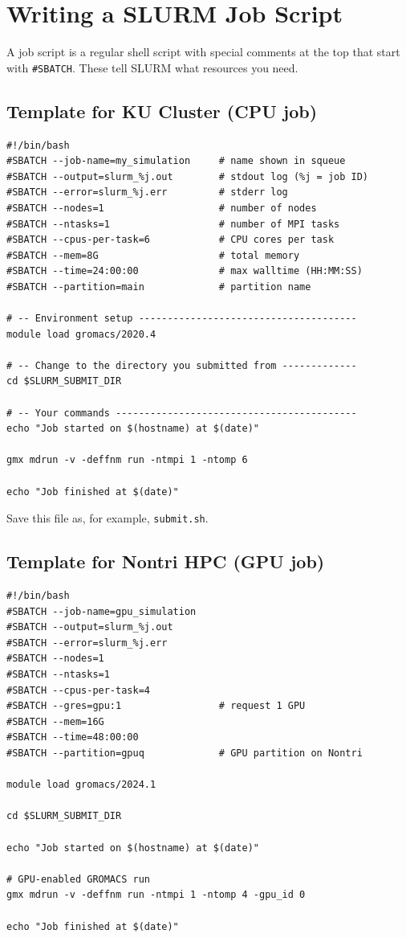 \documentclass[12pt,a4paper]{article}
\begin{document}
\section{Writing a SLURM Job Script}

A job script is a regular shell script with special comments at the top
that start with \texttt{\#SBATCH}. These tell SLURM what resources you need.

\subsection{Template for KU Cluster (CPU job)}

\begin{lstlisting}[style=bash]
#!/bin/bash
#SBATCH --job-name=my_simulation     # name shown in squeue
#SBATCH --output=slurm_%j.out        # stdout log (%j = job ID)
#SBATCH --error=slurm_%j.err         # stderr log
#SBATCH --nodes=1                    # number of nodes
#SBATCH --ntasks=1                   # number of MPI tasks
#SBATCH --cpus-per-task=6            # CPU cores per task
#SBATCH --mem=8G                     # total memory
#SBATCH --time=24:00:00              # max walltime (HH:MM:SS)
#SBATCH --partition=main             # partition name

# -- Environment setup --------------------------------------
module load gromacs/2020.4

# -- Change to the directory you submitted from -------------
cd $SLURM_SUBMIT_DIR

# -- Your commands ------------------------------------------
echo "Job started on $(hostname) at $(date)"

gmx mdrun -v -deffnm run -ntmpi 1 -ntomp 6

echo "Job finished at $(date)"
\end{lstlisting}

Save this file as, for example, \texttt{submit.sh}.

\subsection{Template for Nontri HPC (GPU job)}

\begin{lstlisting}[style=bash]
#!/bin/bash
#SBATCH --job-name=gpu_simulation
#SBATCH --output=slurm_%j.out
#SBATCH --error=slurm_%j.err
#SBATCH --nodes=1
#SBATCH --ntasks=1
#SBATCH --cpus-per-task=4
#SBATCH --gres=gpu:1                 # request 1 GPU
#SBATCH --mem=16G
#SBATCH --time=48:00:00
#SBATCH --partition=gpuq             # GPU partition on Nontri

module load gromacs/2024.1

cd $SLURM_SUBMIT_DIR

echo "Job started on $(hostname) at $(date)"

# GPU-enabled GROMACS run
gmx mdrun -v -deffnm run -ntmpi 1 -ntomp 4 -gpu_id 0

echo "Job finished at $(date)"
\end{lstlisting}
\end{document}
